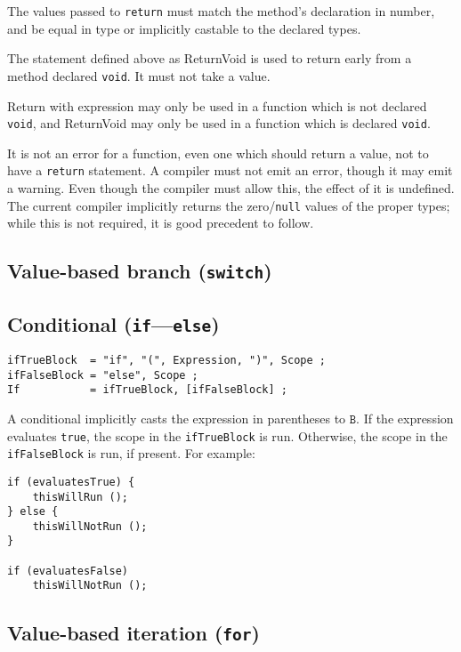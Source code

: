 \documentclass{article}
\newcommand{\R}[1]{\mathtt{#1}}
\begin{document}
The values passed to \texttt{return} must match the method's declaration in
number, and be equal in type or implicitly castable to the declared types.

The statement defined above as ReturnVoid is used to return early from a
method declared \texttt{void}. It must not take a value.

Return with expression may only be used in a function which is not declared
\texttt{void}, and ReturnVoid may only be used in a function which is declared
\texttt{void}.

It is not an error for a function, even one which should return a value, not
to have a \texttt{return} statement. A compiler must not emit an error, though
it may emit a warning. Even though the compiler must allow this, the effect of
it is undefined. The current compiler implicitly returns the
zero/\texttt{null} values of the proper types; while this is not required, it
is good precedent to follow.

\subsection{Value-based branch (\texttt{switch})}
\label{sub:statements:switch}

\subsection{Conditional (\texttt{if}---\texttt{else})}
\label{sub:statements:if}
\begin{verbatim}
ifTrueBlock  = "if", "(", Expression, ")", Scope ;
ifFalseBlock = "else", Scope ;
If           = ifTrueBlock, [ifFalseBlock] ;
\end{verbatim}

A conditional implicitly casts the expression in parentheses to $\R{B}$. If
the expression evaluates \texttt{true}, the scope in the \texttt{ifTrueBlock}
is run. Otherwise, the scope in the \texttt{ifFalseBlock} is run, if present.
For example:

\begin{verbatim}
if (evaluatesTrue) {
    thisWillRun ();
} else {
    thisWillNotRun ();
}

if (evaluatesFalse)
    thisWillNotRun ();
\end{verbatim}


\subsection{Value-based iteration (\texttt{for})}
\label{sub:statements:for}
\end{document}
